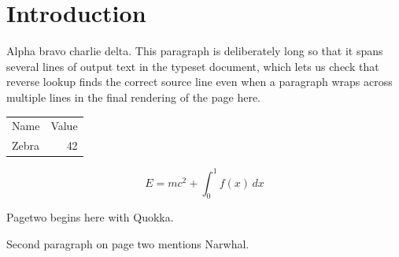 \documentclass{article}
\begin{document}
\section{Introduction}
Alpha bravo charlie delta.
This paragraph is deliberately long so that it spans several lines of
output text in the typeset document, which lets us check that reverse
lookup finds the correct source line even when a paragraph wraps
across multiple lines in the final rendering of the page here.



\begin{tabular}{|l|r|}
\hline
Name & Value \\
Zebra & 42 \\
\hline
\end{tabular}

\begin{equation}
E = mc^2 + \int_0^1 f(x)\,dx
\end{equation}

\newpage
Pagetwo begins here with Quokka.

Second paragraph on page two mentions Narwhal.
\end{document}

